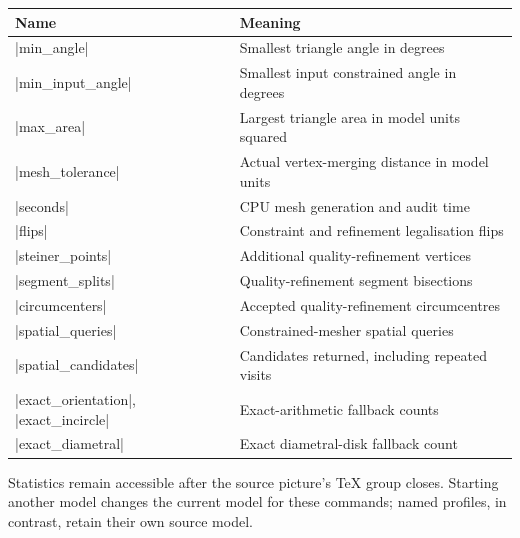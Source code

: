 \begin{center}
\begin{tabular}{ll}
\toprule Name & Meaning \\
\midrule
|min_angle| & Smallest triangle angle in degrees \\
|min_input_angle| & Smallest input constrained angle in degrees \\
|max_area| & Largest triangle area in model units squared \\
|mesh_tolerance| & Actual vertex-merging distance in model units \\
|seconds| & CPU mesh generation and audit time \\
|flips| & Constraint and refinement legalisation flips \\
|steiner_points| & Additional quality-refinement vertices \\
|segment_splits| & Quality-refinement segment bisections \\
|circumcenters| & Accepted quality-refinement circumcentres \\
|spatial_queries| & Constrained-mesher spatial queries \\
|spatial_candidates| & Candidates returned, including repeated visits \\
|exact_orientation|, |exact_incircle| & Exact-arithmetic fallback counts \\
|exact_diametral| & Exact diametral-disk fallback count \\
\bottomrule
\end{tabular}
\end{center}
Statistics remain accessible after the source picture's TeX group closes.
Starting another model changes the current model for these commands;
named profiles, in contrast, retain their own source model.
